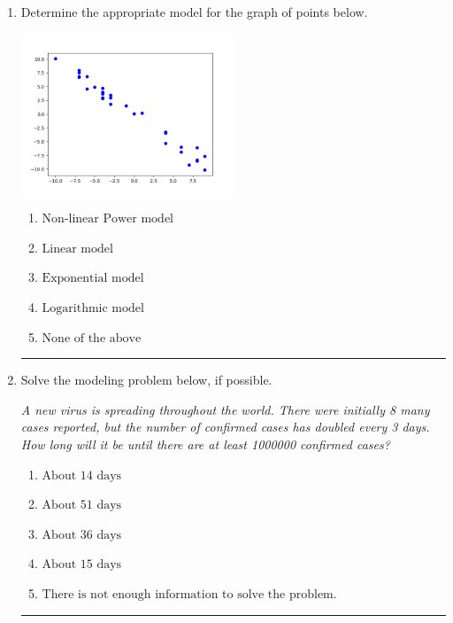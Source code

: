 \documentclass[14pt]{extbook}
\newcommand{\litem}[1]{\item#1\hspace*{-1cm}\rule{\textwidth}{0.4pt}}
\begin{document}
\begin{enumerate}
{\begin{enumerate}[label=\Alph*.]
\end{enumerate} }
\litem{
Determine the appropriate model for the graph of points below.
\begin{center}
    \includegraphics[width=0.5\textwidth]{../Figures/identifyModelGraph12CopyB.png}
\end{center}
\begin{enumerate}[label=\Alph*.]
\item \( \text{Non-linear Power model} \)
\item \( \text{Linear model} \)
\item \( \text{Exponential model} \)
\item \( \text{Logarithmic model} \)
\item \( \text{None of the above} \)

\end{enumerate} }
\litem{
Solve the modeling problem below, if possible.
\begin{center}
    \textit{ A new virus is spreading throughout the world. There were initially 8 many cases reported, but the number of confirmed cases has doubled every 3 days. How long will it be until there are at least 1000000 confirmed cases? }
\end{center}
\begin{enumerate}[label=\Alph*.]
\item \( \text{About } 14 \text{ days} \)
\item \( \text{About } 51 \text{ days} \)
\item \( \text{About } 36 \text{ days} \)
\item \( \text{About } 15 \text{ days} \)
\item \( \text{There is not enough information to solve the problem.} \)


\end{enumerate}}
\end{enumerate}
\end{document}
